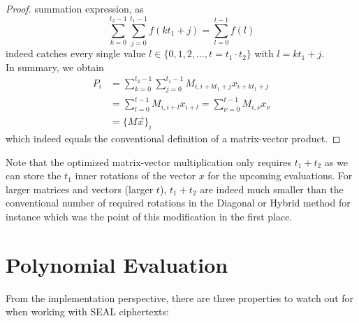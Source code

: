 \begin{proof}
  summation expression, as $$\sum_{k=0}^{t_2-1} \sum_{j=0}^{t_1-1} f(kt_1+j) = \sum_{l=0}^{t-1} f(l)$$
  indeed catches every single value $l \in \{0, 1, 2, ..., t=t_1 \cdot t_2\}$ with $l = kt_1+j$. \\
  In summary, we obtain
  \begin{align*}
    P_i & = \sum_{k=0}^{t_2-1} \sum_{j=0}^{t_1-1} M_{i,i+kt_1+j} x_{i+kt_1+j} \\
        & = \sum_{l=0}^{t-1} M_{i,i+l} x_{i+l}
    = \sum_{\nu=0}^{t-1} M_{i,\nu} x_{\nu}                                    \\
        & = \big\{M \vec{x}\big\}_i
  \end{align*}
  which indeed equals the conventional definition of a matrix-vector product.
\end{proof}

Note that the optimized matrix-vector multiplication only requires $t_1 + t_2$ as
we can store the $t_1$ inner rotations of the vector $x$ for the upcoming evaluations.
For larger matrices and vectors (larger $t$), $t_1 + t_2$ are indeed much smaller than
the conventional number of required rotations in the Diagonal or Hybrid method for instance
which was the point of this modification in the first place.

\section{Polynomial Evaluation}
From the implementation perspective, there are three properties to watch out for when
working with SEAL ciphertexts:

